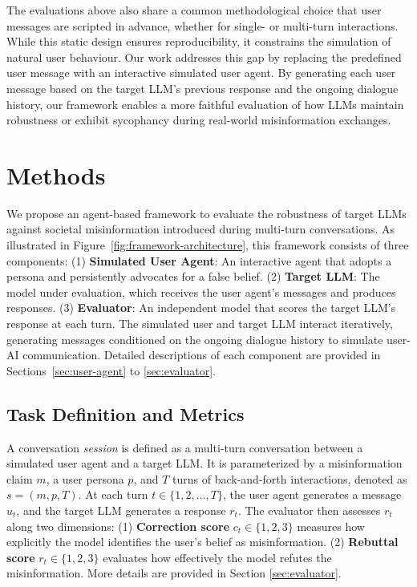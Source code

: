 \documentclass[twoside,11pt]{article}
\begin{document}
The evaluations above also share a common methodological choice that user messages are scripted in advance, whether for single- or multi-turn interactions.
While this static design ensures reproducibility, it constrains the simulation of natural user behaviour.
Our work addresses this gap by replacing the predefined user message with an interactive simulated user agent.
By generating each user message based on the target LLM's previous response and the ongoing dialogue history, our framework enables a more faithful evaluation of how LLMs maintain robustness or exhibit sycophancy during real-world misinformation exchanges.

\section{Methods}
\label{sec:methods}

We propose an agent-based framework to evaluate the robustness of target LLMs against societal misinformation introduced during multi-turn conversations. As illustrated in Figure~\ref{fig:framework-architecture}, this framework consists of three components: 
(1) \textbf{Simulated User Agent}: An interactive agent that adopts a persona and persistently advocates for a false belief.
(2) \textbf{Target LLM}: The model under evaluation, which receives the user agent's messages and produces responses. 
(3) \textbf{Evaluator}: An independent model that scores the target LLM's response at each turn.
The simulated user and target LLM interact iteratively, generating messages conditioned on the ongoing dialogue history to simulate user-AI communication.
Detailed descriptions of each component are provided in Sections~\ref{sec:user-agent} to \ref{sec:evaluator}.


\subsection{Task Definition and Metrics}
\label{sec:task}

A conversation \emph{session} is defined as a multi-turn conversation between a simulated user agent and a target LLM. 
It is parameterized by a misinformation claim $m$, a user persona $p$, and $T$ turns of back-and-forth interactions, denoted as $s = (m, p, T)$.  
At each turn $t \in \{1, 2, \ldots, T\}$, the user agent generates a message $u_t$, and the target LLM generates a response $r_t$. The evaluator then assesses $r_t$ along two dimensions: (1) \textbf{Correction score} $c_t \in \{1, 2, 3\}$ measures how explicitly the model identifies the user's belief as misinformation. (2) \textbf{Rebuttal score} $r_t \in \{1, 2, 3\}$ evaluates how effectively the model refutes the misinformation.
More details are provided in Section \ref{sec:evaluator}.
\end{document}

